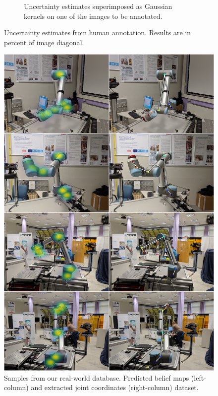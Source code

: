 \documentclass[conference]{IEEEtran}
\begin{document}
\begin{figure}[!h]
\begin{subfigure}[t]{0.49\columnwidth}
            \caption {
                \label{fig:humanuncertainty_belief} 
                Uncertainty estimates superimposed as Gaussian kernels on one of the images to be annotated.
            }
        \end{subfigure}
        \caption {
            \label{fig:uncertainty} 
            Uncertainty estimates from human annotation. Results are in percent of image diagonal.
        }
    \end{figure}

    \begin{figure}[htbp]
        \centerline{
            \includegraphics[width=0.98\columnwidth]{figures/results/ur10_lab/mosaic.png}}
        \caption{
            \label{fig:posresults} Samples from our real-world database. Predicted belief maps (left-column) and extracted joint coordinates (right-column) dataset.
        }
    \end{figure}
\end{document}
